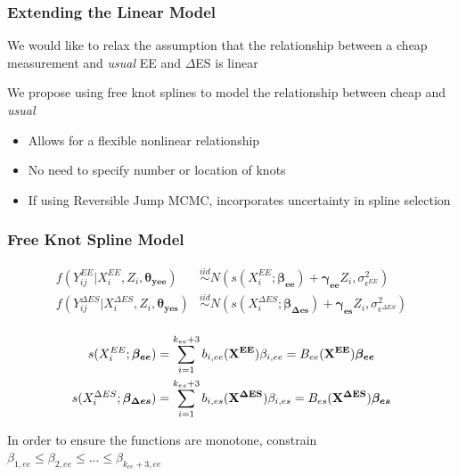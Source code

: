 \documentclass[handout]{beamer}\usepackage[]{graphicx}\usepackage[]{color}
\begin{document}
\begin{frame}
\frametitle{Extending the Linear Model}
We would like to relax the assumption that the relationship between a cheap measurement and \emph{usual} EE and $\Delta$ES is linear \\

\vspace{0.5cm}

We propose using free knot splines to model the relationship between cheap and \emph{usual}

\begin{itemize}
\item
Allows for a flexible nonlinear relationship
\item
No need to specify number or location of knots
\item
If using Reversible Jump MCMC, incorporates uncertainty in spline selection

\end{itemize}


\end{frame}


\begin{frame}
\frametitle{Free Knot Spline Model}

\begin{align*}
  f(Y_{ij}^{EE}|X_i^{EE},Z_i,\boldsymbol{\theta_{yee}}) &\overset{iid}{\sim} N(s(X_i^{EE};\boldsymbol{\beta_{ee}}) + \boldsymbol{\gamma_{ee}}Z_i,\sigma_{\epsilon^{EE}}^2) \\
    f(Y_{ij}^{\Delta ES}|X_i^{\Delta ES},Z_i,\boldsymbol{\theta_{yes}}) &\overset{iid}{\sim} N(s(X_i^{\Delta ES};\boldsymbol{\beta_{\Delta es}}) + \boldsymbol{\gamma_{es}}Z_i,\sigma_{\epsilon^{\Delta ES}}^2) \\
\end{align*}

\begin{align*}
  s(X_i^{EE};\boldsymbol{\beta_{ee}}) &= \sum_{i=1}^{k_{ee}+3} b_{i,ee}({\bf X^{EE}}) \beta_{i,ee} = B_{ee}({\bf X^{EE}}) \boldsymbol{\beta_{ee}}\\
  s(X_i^{\Delta ES};\boldsymbol{\beta_{\Delta es}}) &= \sum_{i=1}^{k_{es}+3} b_{i,es}({\bf X^{\Delta ES}}) \beta_{i,es} = B_{es}({\bf X^{\Delta ES}}) \boldsymbol{\beta_{es}}
\end{align*}

In order to ensure the functions are monotone, constrain $\beta_{1,ee} \leq \beta_{2,ee} \leq ... \leq \beta_{k_{ee}+3,ee}$ 

% 
% 

\end{frame}
\end{document}
